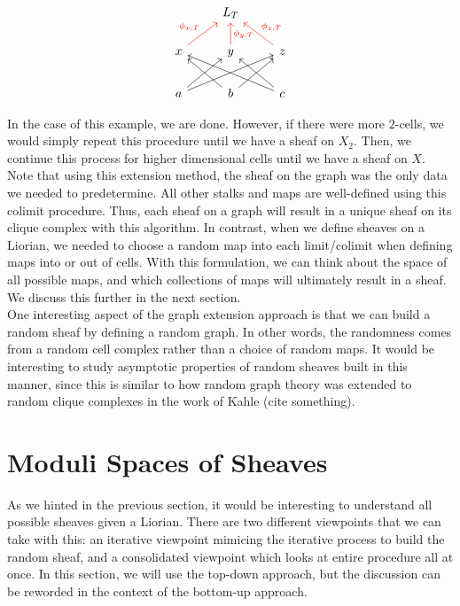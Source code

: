 \documentclass{article}
\newcommand{\clr}{\color{red}}
\theoremstyle{definition}
\begin{document}
\[
\begin{tikzcd}
	& L_T & \\
	x \arrow[red]{ur}{\phi_{x,T}} & y \arrow[swap, red]{u}{\phi_{y,T}} & z \arrow[swap,red]{ul}{\phi_{z,T}} \\
	a \arrow{ur} \arrow{urr} & b \arrow{ur} \arrow{ul} & c \arrow{ul} \arrow{ull}
\end{tikzcd}	
\]

In the case of this example, we are done. However, if there were more $2$-cells, we would simply repeat this procedure until we have a sheaf on $X_2$. Then, we continue this process for higher dimensional cells until we have a sheaf on $X$. \\

Note that using this extension method, the sheaf on the graph was the only data we needed to predetermine. All other stalks and maps are well-defined using this colimit procedure. Thus, each sheaf on a graph will result in a unique sheaf on its clique complex with this algorithm. In contrast, when we define sheaves on a Liorian, we needed to choose a random map into each limit/colimit when defining maps into or out of cells. With this formulation, we can think about the space of all possible maps, and which collections of maps will ultimately result in a sheaf. We discuss this further in the next section.\\

One interesting aspect of the graph extension approach is that we can build a random sheaf by defining a random graph. In other words, the randomness comes from a random cell complex rather than a choice of random maps. It would be interesting to study asymptotic properties of random sheaves built in this manner, since this is similar to how random graph theory was extended to random clique complexes in the work of Kahle ({\clr cite something}). 


\section{Moduli Spaces of Sheaves}
As we hinted in the previous section, it would be interesting to understand all possible sheaves given a Liorian. There are two different viewpoints that we can take with this: an iterative viewpoint mimicing the iterative process to build the random sheaf, and a consolidated viewpoint which looks at entire procedure all at once. In this section, we will use the top-down approach, but the discussion can be reworded in the context of the bottom-up approach.
\end{document}
